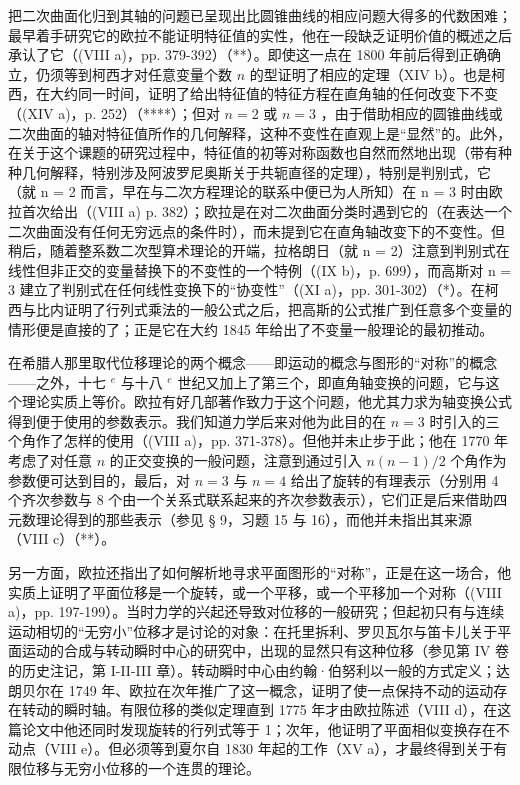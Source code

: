 把二次曲面化归到其轴的问题已呈现出比圆锥曲线的相应问题大得多的代数困难；最早着手研究它的欧拉不能证明特征值的实性，他在一段缺乏证明价值的概述之后承认了它（(VIII a)，pp. 379-392）（**）。即使这一点在 1800 年前后得到正确确立，仍须等到柯西才对任意变量个数 \(n\) 的型证明了相应的定理（XIV b）。也是柯西，在大约同一时间，证明了给出特征值的特征方程在直角轴的任何改变下不变（(XIV a)，p. 252）（****）；但对 \(n = 2\) 或 \(n = 3\) ，由于借助相应的圆锥曲线或二次曲面的轴对特征值所作的几何解释，这种不变性在直观上是“显然”的。此外，在关于这个课题的研究过程中，特征值的初等对称函数也自然而然地出现（带有种种几何解释，特别涉及阿波罗尼奥斯关于共轭直径的定理），特别是判别式，它（就 n = 2 而言，早在与二次方程理论的联系中便已为人所知）在 n = 3 时由欧拉首次给出（(VIII a) p. 382）；欧拉是在对二次曲面分类时遇到它的（在表达一个二次曲面没有任何无穷远点的条件时），而未提到它在直角轴改变下的不变性。但稍后，随着整系数二次型算术理论的开端，拉格朗日（就 n = 2）注意到判别式在线性但非正交的变量替换下的不变性的一个特例（(IX b)，p. 699），而高斯对 n = 3 建立了判别式在任何线性变换下的“协变性”（(XI a)，pp. 301-302）（*）。在柯西与比内证明了行列式乘法的一般公式之后，把高斯的公式推广到任意多个变量的情形便是直接的了；正是它在大约 1845 年给出了不变量一般理论的最初推动。

在希腊人那里取代位移理论的两个概念——即运动的概念与图形的“对称”的概念——之外，十七 \(^{e}\) 与十八 \(^{e}\) 世纪又加上了第三个，即直角轴变换的问题，它与这个理论实质上等价。欧拉有好几部著作致力于这个问题，他尤其力求为轴变换公式得到便于使用的参数表示。我们知道力学后来对他为此目的在 \(n = 3\) 时引入的三个角作了怎样的使用（(VIII a)，pp. 371-378）。但他并未止步于此；他在 1770 年考虑了对任意 \(n\) 的正交变换的一般问题，注意到通过引入 \(n(n - 1)/2\) 个角作为参数便可达到目的，最后，对 \(n = 3\) 与 \(n = 4\) 给出了旋转的有理表示（分别用 4 个齐次参数与 8 个由一个关系式联系起来的齐次参数表示），它们正是后来借助四元数理论得到的那些表示（参见 § 9，习题 15 与 16），而他并未指出其来源（VIII c）（**）。

另一方面，欧拉还指出了如何解析地寻求平面图形的“对称”，正是在这一场合，他实质上证明了平面位移是一个旋转，或一个平移，或一个平移加一个对称（(VIII a)，pp. 197-199）。当时力学的兴起还导致对位移的一般研究；但起初只有与连续运动相切的“无穷小”位移才是讨论的对象：在托里拆利、罗贝瓦尔与笛卡儿关于平面运动的合成与转动瞬时中心的研究中，出现的显然只有这种位移（参见第 IV 卷的历史注记，第 I-II-III 章）。转动瞬时中心由约翰·伯努利以一般的方式定义；达朗贝尔在 1749 年、欧拉在次年推广了这一概念，证明了使一点保持不动的运动存在转动的瞬时轴。有限位移的类似定理直到 1775 年才由欧拉陈述（VIII d），在这篇论文中他还同时发现旋转的行列式等于 1；次年，他证明了平面相似变换存在不动点（VIII e）。但必须等到夏尔自 1830 年起的工作（XV a），才最终得到关于有限位移与无穷小位移的一个连贯的理论。
